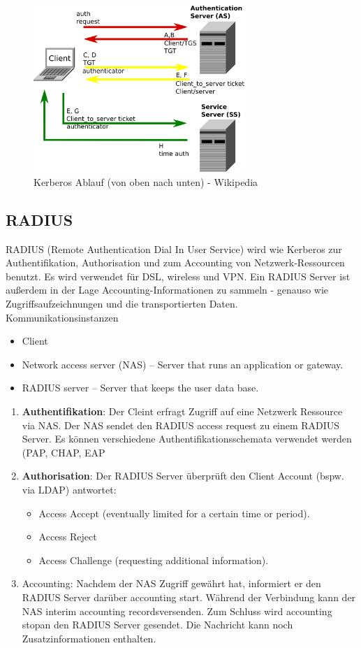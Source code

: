\documentclass{article} %
\begin{document}
\begin{figure}[ht]
	\centering
  \includegraphics[width=8cm]{img/kerberos.png}
	\caption{Kerberos Ablauf (von oben nach unten) - Wikipedia}
\end{figure}

\subsection{RADIUS}
RADIUS (Remote Authentication Dial In User Service) wird wie Kerberos zur Authentifikation, Authorisation und zum Accounting von Netzwerk-Ressourcen benutzt. Es wird verwendet für DSL, wireless und VPN. Ein RADIUS Server ist außerdem in der Lage Accounting-Informationen zu sammeln - genauso wie Zugriffsaufzeichnungen und die transportierten Daten.\\

\noindent Kommunikationsinstanzen
	\begin{itemize}
	\item Client
	\item Network access server (NAS) – Server that runs an application or gateway. 
	\item RADIUS server – Server that keeps the user data base. 
	\end{itemize}
	
	\begin{enumerate}
	\item \textbf{Authentifikation}: Der Cleint erfragt Zugriff auf eine Netzwerk Ressource via NAS. Der NAS sendet den RADIUS access request zu einem RADIUS Server. Es können verschiedene Authentifikationsschemata verwendet werden (PAP, CHAP, EAP
	\item \textbf{Authorisation}: Der RADIUS Server überprüft den Client Account (bspw. via LDAP) antwortet:
		\begin{itemize}
		\item Access Accept (eventually limited for a certain time or period). 
		\item Access Reject 
		\item Access Challenge (requesting additional information). 
		\end{itemize}
	\item Accounting: Nachdem der NAS Zugriff gewährt hat, informiert er den RADIUS Server darüber \glqq accounting start\grqq. Während der Verbindung kann der NAS \glqq interim accounting records\grqq versenden. Zum Schluss wird \glqq accounting stop\grqq an den RADIUS Server gesendet. Die Nachricht kann noch Zusatzinformationen enthalten.
	\end{enumerate}
\end{document}
